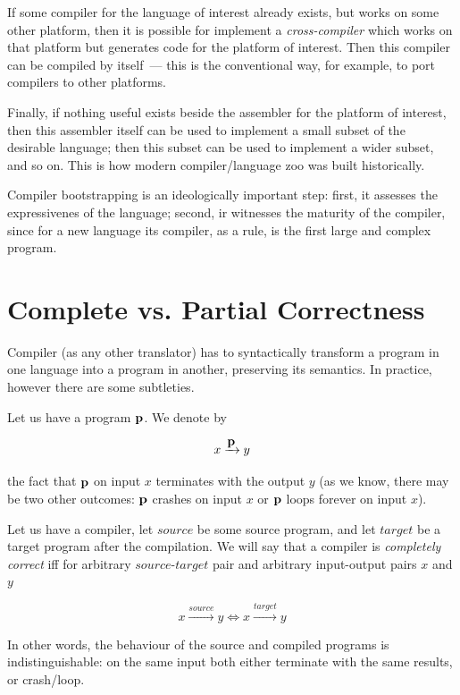 If some compiler for the language of interest already exists, but works on some other platform, then it is possible for
implement a \emph{cross-compiler} which works on that platform but generates code for the platform of interest. Then
this compiler can be compiled by itself~--- this is the conventional way, for example, to port  compilers
to other platforms.

Finally, if nothing useful exists beside the assembler for the platform of interest, then this assembler itself can be
used to implement a small subset of the desirable language; then this subset can be used to implement a wider subset, and so on.
This is how modern compiler/language zoo was built historically.

Compiler bootstrapping is an ideologically important step: first, it assesses the expressivenes of the language; second, ir witnesses the
maturity of the compiler, since for a new language its compiler, as a rule, is the first large and complex program.

\section{Complete vs. Partial Correctness}

Compiler (as any other translator) has to syntactically transform a program in one language into a program in another, preserving its semantics.
In practice, however there are some subtleties.

Let us have a program $\mathbf{p}$. We denote by

\[
x\xrightarrow{\displaystyle{\mathbf{p}}} y
\]

the fact that $\mathbf{p}$ on input $x$ terminates with the output $y$ (as we know, there may be two other outcomes: $\mathbf{p}$ crashes on input $x$ or
$\mathbf{p}$ loops forever on input $x$). 

Let us have a compiler, let $source$ be some source program, and let $target$ be a target program after the compilation.
We will say that a compiler is \emph{completely correct} iff for arbitrary $source$-$target$ pair and arbitrary
input-output pairs $x$ and $y$

\[
x\xrightarrow{\displaystyle{source}}y \Longleftrightarrow x\xrightarrow{\displaystyle{target}}y
\]

In other words, the behaviour of the source and compiled programs is indistinguishable: on the same input both either
terminate with the same results, or crash/loop.

